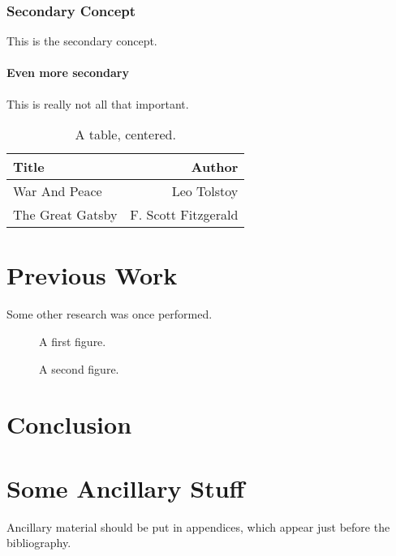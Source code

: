 \documentclass[12pt]{gatech-thesis}
\begin{document}
\subsection{Secondary Concept}

This is the secondary concept.

\subsubsection{Even more secondary}

This is really not all that important.

\begin{table}
\caption{A table, centered.}
\begin{center}
\begin{tabular}{|l|r|}
  \hline 
Title & Author \\
\hline
War And Peace & Leo Tolstoy \\
The Great Gatsby & F. Scott Fitzgerald \\ \hline
\end{tabular}
\end{center}
\end{table}
\chapter{Previous Work}

Some other research was once performed.

\begin{figure}
\caption{A first figure.}
\end{figure}

\begin{figure}
\caption{A second figure.}
\end{figure}
\chapter{Conclusion}

\nocite{*}
\appendix
\chapter{Some Ancillary Stuff}

Ancillary material should be put in appendices, which 
appear just before the bibliography. 
\end{document}
